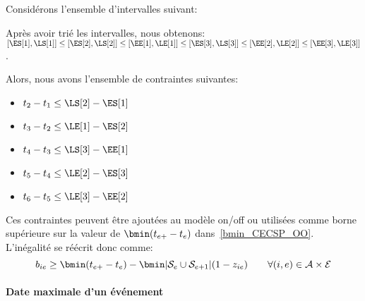 \begin{ex}
\label{ex:evt_sep} Considérons l'ensemble d'intervalles suivant:
\begin{center}
\end{center}

Après avoir trié les intervalles, nous obtenons:
$[\ES[1],\LS[1]] \le [\ES[2],\LS[2]] \le
[\EE[1],\LE[1]] \le [\ES[3],\LS[3]]\le
[\EE[2],\LE[2]] \le [\EE[3],\LE[3]]$.

Alors, nous avons l'ensemble de contraintes suivantes:

\begin{itemize}
\item $t_2-t_1 \le \LS[2]-\ES[1]$
\item $t_3-t_2 \le \LE[1]-\ES[2]$
\item $t_4-t_3 \le \LS[3]-\EE[1]$
\item $t_5-t_4 \le \LE[2]-\ES[3]$
\item $t_6-t_5 \le \LE[3]-\EE[2]$
\end{itemize}
\end{ex}


Ces contraintes peuvent être ajoutées au modèle on/off ou utilisées
comme borne supérieure sur la valeur de $\bmin(t_{e+}-t_e)$
dans~\eqref{bmin_CECSP_OO}. L'inégalité se réécrit donc comme:
\[ b_{ie} \ge \bmin(t_{e+}-t_e) - \bmin|{\cal S}_e \cup {\cal
    S}_{e+1}|(1-z_{ie})\qquad \forall (i,e) \in {\cal A}\times{\cal
    E}
\] 

\paragraph{Date maximale d'un événement}


